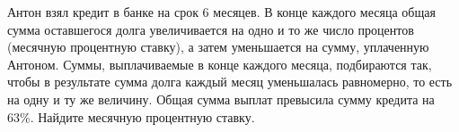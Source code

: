 \begin{ex}
	\begin{condition}
		Антон взял кредит в банке на срок 6 месяцев. В конце каждого месяца общая сумма оставшегося долга увеличивается на одно и то же число процентов (месячную процентную ставку), а затем уменьшается на сумму, уплаченную Антоном. Суммы, выплачиваемые в конце каждого месяца, подбираются так, чтобы в результате сумма долга каждый месяц уменьшалась равномерно, то есть на одну и ту же величину. Общая сумма выплат превысила сумму кредита на 63\%. Найдите месячную процентную ставку.
	\end{condition}
\end{ex}